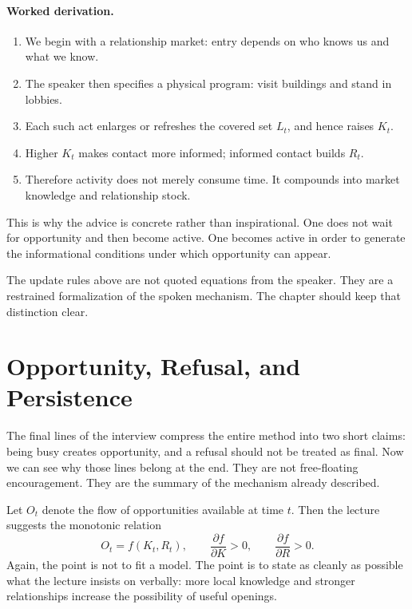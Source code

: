 \paragraph{Worked derivation.}
\begin{enumerate}
\item We begin with a relationship market: entry depends on who knows us and what we know.
\item The speaker then specifies a physical program: visit buildings and stand in lobbies.
\item Each such act enlarges or refreshes the covered set \(L_t\), and hence raises \(K_t\).
\item Higher \(K_t\) makes contact more informed; informed contact builds \(R_t\).
\item Therefore activity does not merely consume time. It compounds into market knowledge and relationship stock.
\end{enumerate}

This is why the advice is concrete rather than inspirational. One does not wait for opportunity and then become active. One becomes active in order to generate the informational conditions under which opportunity can appear.

\begin{remark}
The update rules above are not quoted equations from the speaker. They are a restrained formalization of the spoken mechanism. The chapter should keep that distinction clear.
\end{remark}

\section{Opportunity, Refusal, and Persistence}

The final lines of the interview compress the entire method into two short claims: being busy creates opportunity, and a refusal should not be treated as final. Now we can see why those lines belong at the end. They are not free-floating encouragement. They are the summary of the mechanism already described.

Let \(O_t\) denote the flow of opportunities available at time \(t\). Then the lecture suggests the monotonic relation
\begin{equation}
O_t = f(K_t,R_t), \qquad \frac{\partial f}{\partial K} > 0, \qquad \frac{\partial f}{\partial R} > 0.
\end{equation}
Again, the point is not to fit a model. The point is to state as cleanly as possible what the lecture insists on verbally: more local knowledge and stronger relationships increase the possibility of useful openings.

